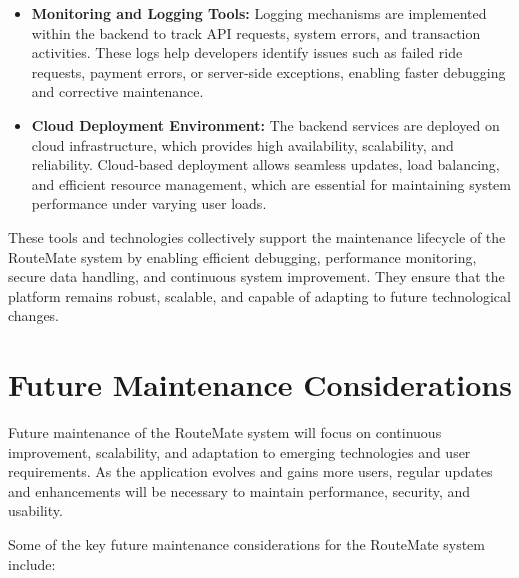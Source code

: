 \documentclass[10pt,a4paper]{report}
\begin{document}
\begin{itemize}
\item \textbf{Monitoring and Logging Tools:}
Logging mechanisms are implemented within the backend to track API requests, system errors, and transaction activities. These logs help developers identify issues such as failed ride requests, payment errors, or server-side exceptions, enabling faster debugging and corrective maintenance.

\item \textbf{Cloud Deployment Environment:}
The backend services are deployed on cloud infrastructure, which provides high availability, scalability, and reliability. Cloud-based deployment allows seamless updates, load balancing, and efficient resource management, which are essential for maintaining system performance under varying user loads.

\end{itemize}

\justify\large These tools and technologies collectively support the maintenance lifecycle of the RouteMate system by enabling efficient debugging, performance monitoring, secure data handling, and continuous system improvement. They ensure that the platform remains robust, scalable, and capable of adapting to future technological changes.


\section{Future Maintenance Considerations}

\justify\large Future maintenance of the RouteMate system will focus on continuous improvement, scalability, and adaptation to emerging technologies and user requirements. As the application evolves and gains more users, regular updates and enhancements will be necessary to maintain performance, security, and usability.

\justify\large Some of the key future maintenance considerations for the RouteMate system include:
\end{document}
